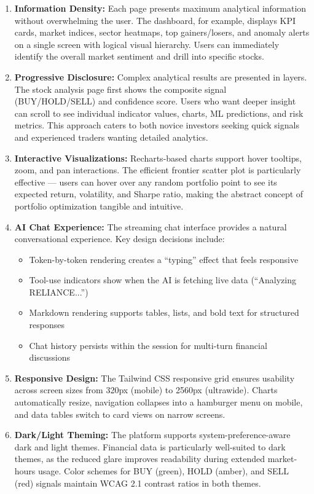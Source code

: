 \documentclass[12pt, a4paper, oneside]{report}
\begin{document}
\begin{enumerate}
    \item \textbf{Information Density:} Each page presents maximum analytical information without overwhelming the user. The dashboard, for example, displays KPI cards, market indices, sector heatmaps, top gainers/losers, and anomaly alerts on a single screen with logical visual hierarchy. Users can immediately identify the overall market sentiment and drill into specific stocks.

    \item \textbf{Progressive Disclosure:} Complex analytical results are presented in layers. The stock analysis page first shows the composite signal (BUY/HOLD/SELL) and confidence score. Users who want deeper insight can scroll to see individual indicator values, charts, ML predictions, and risk metrics. This approach caters to both novice investors seeking quick signals and experienced traders wanting detailed analytics.

    \item \textbf{Interactive Visualizations:} Recharts-based charts support hover tooltips, zoom, and pan interactions. The efficient frontier scatter plot is particularly effective --- users can hover over any random portfolio point to see its expected return, volatility, and Sharpe ratio, making the abstract concept of portfolio optimization tangible and intuitive.

    \item \textbf{AI Chat Experience:} The streaming chat interface provides a natural conversational experience. Key design decisions include:
    \begin{itemize}[nosep]
        \item Token-by-token rendering creates a ``typing'' effect that feels responsive
        \item Tool-use indicators show when the AI is fetching live data (``Analyzing RELIANCE...'')
        \item Markdown rendering supports tables, lists, and bold text for structured responses
        \item Chat history persists within the session for multi-turn financial discussions
    \end{itemize}

    \item \textbf{Responsive Design:} The Tailwind CSS responsive grid ensures usability across screen sizes from 320px (mobile) to 2560px (ultrawide). Charts automatically resize, navigation collapses into a hamburger menu on mobile, and data tables switch to card views on narrow screens.

    \item \textbf{Dark/Light Theming:} The platform supports system-preference-aware dark and light themes. Financial data is particularly well-suited to dark themes, as the reduced glare improves readability during extended market-hours usage. Color schemes for BUY (green), HOLD (amber), and SELL (red) signals maintain WCAG 2.1 contrast ratios in both themes.
\end{enumerate}
\end{document}
